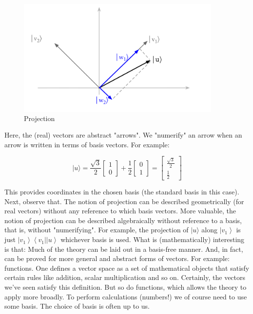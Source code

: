 \documentclass[main.tex]{subfiles}
\begin{document}
    \begin{figure}
        \centering
        \includegraphics[width=4in]{notes/figs/n04/19basischange3.png}
        \caption{Projection}
        \label{fig:19basischange3}
    \end{figure}
    
    Here, the (real) vectors are abstract "arrows". We "numerify" an arrow when an arrow is written in terms of basis vectors. For example:
    
    $$
    |u\rangle=\frac{\sqrt{3}}{2}\left[\begin{array}{l}
    1 \\
    0
    \end{array}\right]+\frac{1}{2}\left[\begin{array}{l}
    0 \\
    1
    \end{array}\right]=\left[\begin{array}{c}
    \frac{\sqrt{3}}{2} \\
    \frac{1}{2}
    \end{array}\right]
    $$
    
    This provides coordinates in the chosen basis (the standard basis in this case). Next, observe that. The notion of projection can be described geometrically (for real vectors) without any reference to which basis vectors. More valuable, the notion of projection can be described algebraically without reference to a basis, that is, without "numerifying". For example, the projection of $|u\rangle$ along $\left|v_{1}\right\rangle$ is just $\left|v_{1}\right\rangle\left\langle v_{1}|| u\right\rangle$ whichever basis is used. What is (mathematically) interesting is that: Much of the theory can be laid out in a basis-free manner. And, in fact, can be proved for more general and abstract forms of vectors. For example: functions. One defines a vector space as a set of mathematical objects that satisfy certain rules like addition, scalar multiplication and so on. Certainly, the vectors we've seen satisfy this definition. But so do functions, which allows the theory to apply more broadly. To perform calculations (numbers!) we of course need to use some basis. The choice of basis is often up to us.
\end{document}
